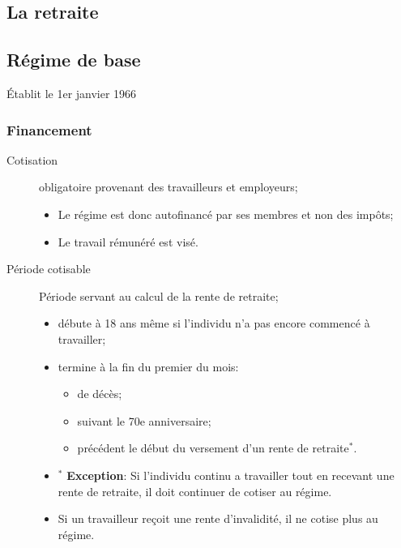 \documentclass[10pt, french]{article}
\begin{document}
\begin{multicols*}{3}
\clearpage 

\section*{La retraite}

\subsection*{Régime de base}
\begin{rappel_enhanced}[Historique]
Établit le 1er janvier 1966
\end{rappel_enhanced}
 
\subsubsection*{Financement}
\begin{description}
	\item[Cotisation]	obligatoire provenant des travailleurs et employeurs;
		\begin{itemize}[leftmargin = *]
			\item	Le régime est donc autofinancé par ses membres et non des impôts;
			\item	Le travail rémunéré est visé.
		\end{itemize}
	\item[Période cotisable]	Période servant au calcul de la rente de retraite;
		\begin{itemize}[leftmargin = *]
			\item	débute à 18 ans même si l'individu n'a pas encore commencé à travailler;
			\item	termine à la fin du premier du mois:  
				\begin{itemize}[leftmargin = *]
				\item	de décès;
				\item	suivant le 70e anniversaire;
				\item	précédent le début du versement d'un rente de retraite$^{*}$.
				\end{itemize}
			\item[]	$^{*}$ \textbf{Exception}: Si l'individu continu a travailler tout en recevant une rente de retraite, il doit continuer de cotiser au régime.
			\item	Si un travailleur reçoit une rente d'invalidité, il ne cotise plus au régime.
		\end{itemize}

\end{description}
\end{multicols*}
\end{document}
